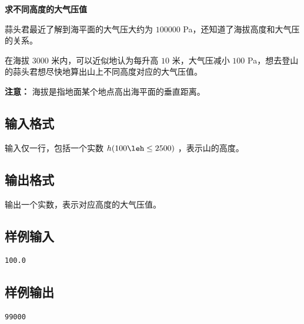\documentclass{article}
\newcommand{\problemname}[1]{\begin{center}\Large\bfseries #1\end{center}}
\begin{document}
\problemname{求不同高度的大气压值}

蒜头君最近了解到海平面的大气压大约为 $100000$ Pa，还知道了海拔高度和大气压的关系。

在海拔 $3000$ 米内，可以近似地认为每升高 $10$ 米，大气压减小 $100$ Pa，想去登山的蒜头君想尽快地算出山上不同高度对应的大气压值。

\textbf{注意：} 海拔是指地面某个地点高出海平面的垂直距离。

\subsection*{输入格式}
输入仅一行，包括一个实数 $h(100\leh\le2500)$ ，表示山的高度。

\subsection*{输出格式}
输出一个实数，表示对应高度的大气压值。

\subsection*{样例输入}
\begin{verbatim}
100.0
\end{verbatim}

\subsection*{样例输出}
\begin{verbatim}
99000
\end{verbatim}
\end{document}

